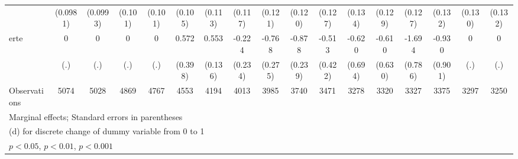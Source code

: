 {\begin{tabular}{l*{16}{c}}
                    &    (0.0981)         &    (0.0993)         &     (0.101)         &     (0.101)         &     (0.105)         &     (0.113)         &     (0.117)         &     (0.121)         &     (0.120)         &     (0.127)         &     (0.134)         &     (0.129)         &     (0.127)         &     (0.132)         &     (0.130)         &     (0.132)         \\
[1em]
erte                &           0         &           0         &           0         &           0         &       0.572         &       0.553\sym{***}&      -0.224         &      -0.768\sym{**} &      -0.878\sym{***}&      -0.513         &      -0.620         &      -0.610         &      -1.694\sym{*}  &      -0.930         &           0         &           0         \\
                    &         (.)         &         (.)         &         (.)         &         (.)         &     (0.398)         &     (0.136)         &     (0.234)         &     (0.275)         &     (0.239)         &     (0.422)         &     (0.694)         &     (0.630)         &     (0.786)         &     (0.901)         &         (.)         &         (.)         \\
\hline
Observations        &        5074         &        5028         &        4869         &        4767         &        4553         &        4194         &        4013         &        3985         &        3740         &        3471         &        3278         &        3320         &        3327         &        3375         &        3297         &        3250         \\
\hline\hline
\multicolumn{17}{l}{\footnotesize Marginal effects; Standard errors in parentheses}\\
\multicolumn{17}{l}{\footnotesize  (d) for discrete change of dummy variable from 0 to 1}\\
\multicolumn{17}{l}{\footnotesize \sym{*} \(p<0.05\), \sym{**} \(p<0.01\), \sym{***} \(p<0.001\)}\\
\end{tabular}
}
